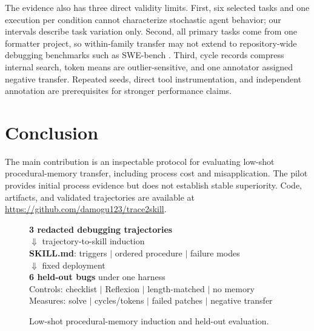\documentclass[sigconf,screen,pbalance]{acmart}
\begin{document}
The evidence also has three direct validity limits. First, six selected tasks
and one execution per condition cannot characterize stochastic agent behavior;
our intervals describe task variation only. Second, all primary tasks come
from one formatter project, so within-family transfer may not extend to
repository-wide debugging benchmarks such as SWE-bench
\cite{jimenez2024swebench,yang2024sweagent}. Third, cycle records compress
internal search, token means are outlier-sensitive, and one annotator assigned
negative transfer. Repeated seeds, direct tool instrumentation, and independent
annotation are prerequisites for stronger performance claims.

\section{Conclusion}
The main contribution is an inspectable protocol for evaluating low-shot
procedural-memory transfer, including process cost and misapplication. The
pilot provides initial process evidence but does not establish stable
superiority. Code, artifacts, and validated trajectories are available at
\url{https://github.com/damogu123/trace2skill}.

\begin{figure}[b]
\centering
\begin{minipage}{.96\columnwidth}
\centering
\textbf{3 redacted debugging trajectories}\\[2pt]
$\Downarrow$ trajectory-to-skill induction\\[2pt]
\textbf{SKILL.md}: triggers $\mid$ ordered procedure $\mid$ failure modes\\[2pt]
$\Downarrow$ fixed deployment\\[2pt]
\textbf{6 held-out bugs} under one harness\\
Controls: checklist $\mid$ Reflexion $\mid$ length-matched $\mid$ no memory\\
Measures: solve $\mid$ cycles/tokens $\mid$ failed patches $\mid$ negative transfer
\end{minipage}
\caption{Low-shot procedural-memory induction and held-out evaluation.}
\label{fig:poster_protocol}
\end{figure}



\end{document}
